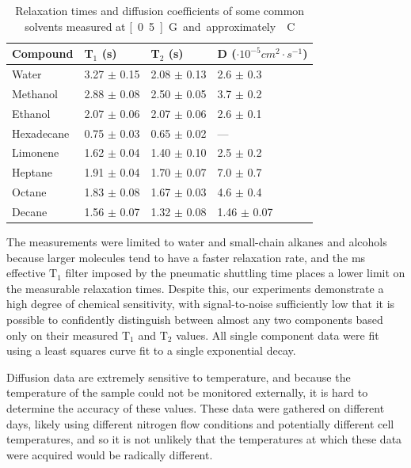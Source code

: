 \documentclass[PaulGanssle-Thesis.tex]{subfiles}
\begin{document}
\begin{table}[h]
\centering
\tabulinesep=1.5mm
\begin{tabu} spread 0.85 \hline
Compound 	& T$_1$ (s)			& 	T$_2$ (s) 		& D ($\cdot{}10^{-5} cm^2\cdot{}s^{-1}$) \\ \hline
Water 		& 3.27 $\pm $ 0.15 	& 2.08 $\pm$ 0.13 	& 2.6 $\pm$ 0.3  	\\ 
Methanol 	& 2.88 $\pm$ 0.08 	& 2.50 $\pm$ 0.05 	& 3.7 $\pm$ 0.2  	\\ 
Ethanol 	& 2.07 $\pm$ 0.06 	& 2.07 $\pm$ 0.06 	& 2.6 $\pm$ 0.1	 	\\ 
Hexadecane 	& 0.75 $\pm$ 0.03 	& 0.65 $\pm$ 0.02 	& --- 		 	\\ 
Limonene 	& 1.62 $\pm$ 0.04 	& 1.40 $\pm$ 0.10 	& 2.5 $\pm$ 0.2  	\\ 
Heptane 	& 1.91 $\pm$ 0.04 	& 1.70 $\pm$ 0.07 	& 7.0 $\pm$ 0.7	 	\\ 
Octane 		& 1.83 $\pm$ 0.08 	& 1.67 $\pm$ 0.03 	& 4.6 $\pm$ 0.4  	\\
Decane 		& 1.56 $\pm$ 0.07 	& 1.32 $\pm$ 0.08 	& 1.46 $\pm$ 0.07	\\ \hline
\end{tabu}
\caption{Relaxation times and diffusion coefficients of some common solvents measured at \unit[0.5]{G} and approximately \unit[37]{\degsym C}}
\label{Table:T1T2DataParams}
\end{table}

The measurements were limited to water and small-chain alkanes and alcohols because larger molecules tend to have a faster relaxation rate, and the \unit[700]{ms} effective $\mathrm{T}_{1}$ filter imposed by the pneumatic shuttling time places a lower limit on the measurable relaxation times. Despite this, our experiments demonstrate a high degree of chemical sensitivity, with signal-to-noise sufficiently low that it is possible to confidently distinguish between almost any two components based only on their measured $\mathrm{T}_{1}$ and $\mathrm{T}_{2}$ values. All single component data were fit using a least squares curve fit to a single exponential decay. 

Diffusion data are extremely sensitive to temperature, and because the temperature of the sample could not be monitored externally, it is hard to determine the accuracy of these values. These data were gathered on different days, likely using different nitrogen flow conditions and potentially different cell temperatures, and so it is not unlikely that the temperatures at which these data were acquired would be radically different.
\end{document}
